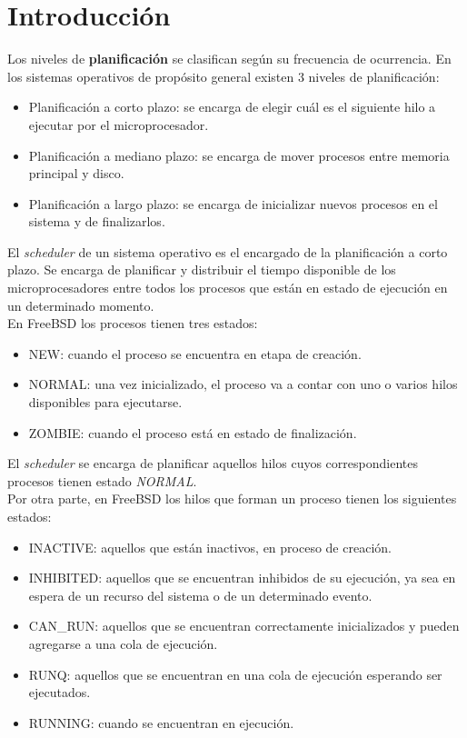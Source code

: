 \documentclass[a4paper]{book}
\begin{document}
\section{Introducci\'on}

Los niveles de \textbf{planificación} se clasifican seg\'un su frecuencia de ocurrencia. En los sistemas operativos de propósito general existen 3 niveles de planificación:
\begin{itemize}
\item Planificación a corto plazo: se encarga de elegir cuál es el siguiente hilo a ejecutar por el microprocesador.
\item Planificación a mediano plazo: se encarga de mover procesos entre memoria principal y disco.
\item Planificación a largo plazo: se encarga de inicializar nuevos procesos en el sistema y de finalizarlos.
\end{itemize}
\vspace{0.2cm}

El \emph{scheduler} de un sistema operativo es el encargado de la planificación a corto plazo. Se encarga de planificar y distribuir el tiempo disponible de los microprocesadores entre todos los procesos que están en estado de ejecución en un determinado momento.\\

En FreeBSD los procesos tienen tres estados:
\begin{itemize}
\item NEW: cuando el proceso se encuentra en etapa de creación.
\item NORMAL: una vez inicializado, el proceso va a contar con uno o varios hilos disponibles para ejecutarse.
\item ZOMBIE: cuando el proceso está en estado de finalización.
\end{itemize}

El \emph{scheduler} se encarga de planificar aquellos hilos cuyos correspondientes procesos tienen estado \emph{NORMAL}.\\

Por otra parte, en FreeBSD los hilos que forman un proceso tienen los siguientes estados:
\begin{itemize}
\item INACTIVE: aquellos que están inactivos, en proceso de creación.
\item INHIBITED: aquellos que se encuentran inhibidos de su ejecución, ya sea en espera de un recurso del sistema o de un determinado evento.
\item CAN\_RUN: aquellos que se encuentran correctamente inicializados y pueden agregarse a una cola de ejecución.
\item RUNQ: aquellos que se encuentran en una cola de ejecución esperando ser ejecutados.
\item RUNNING: cuando se encuentran en ejecución.
\end{itemize}
\end{document}
